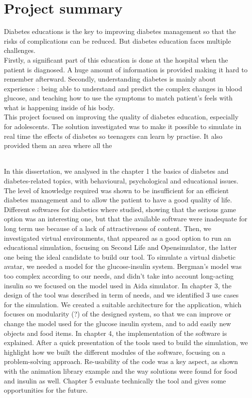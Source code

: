 \section{Project summary}
Diabetes educations is the key to improving diabetes management so that the risks of complications can be reduced. But diabetes education faces multiple challenges.\\
Firstly, a significant part of this education is done at the hospital when the patient is diagnosed. A huge amount of information is provided making it hard to remember afterward.
Secondly, understanding diabetes is mainly about experience : being able to understand and predict the complex changes in blood glucose, and teaching how to use the symptoms to match patient's feels with what is happening inside of his body.\\

This project focused on improving the quality of diabetes education, especially for adolescents. The solution investigated was to make it possible to simulate in real time the effects of diabetes so teenagers can learn by practise. It also provided them an area where all the 


\\In this dissertation, we analysed in the chapter 1 the basics of diabetes and diabetes-related topics, with behavioural, psychological and educational issues. The level of knowledge required was shown to be insufficient for an efficient diabetes management and to allow the patient to have a good quality of life. Different softwares for diabetics where studied, showing that the serious game option was an interesting one, but that the available software were inadequate for long term use because of a lack of attractiveness of content. Then, we investigated virtual environments, that appeared as a good option to run an educational simulation, focusing on Second Life and Opensimulator, the latter one being the ideal candidate to build our tool. To simulate a virtual diabetic avatar, we needed a model for the glucose-insulin system.
Bergman's model was too complex according to our needs, and didn't take into account long-acting insulin %
so we focused on the model used in Aida simulator.
In chapter 3, the design of the tool was described in term of needs, and we identified 3 use cases for the simulation. 
We created a suitable architecture for the application, which focuses on modularity (?) of the designed system, so that we can improve or change the model 
used for the glucose insulin system, and to add easily new objects and food items.
In chapter 4, the implementation of the software is explained. After a quick presentation of the tools used to build the simulation, 
we highlight how we built the different modules of the software, focusing on a problem-solving approach. 
Re-usability of the code was a key aspect, as shown with the animation library example and the way solutions were found for food and insulin as well.
Chapter 5 evaluate technically the tool and gives some opportunities for the future.

